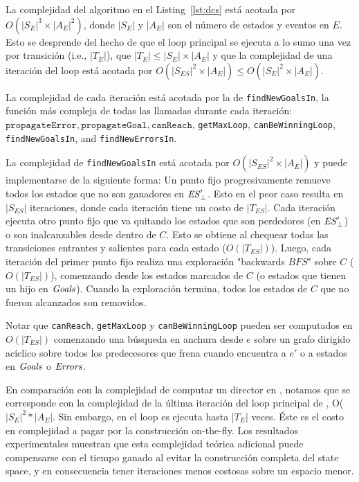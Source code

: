 La complejidad del algoritmo en el Listing~\ref{lst:dcs} está acotada por
	$O(|S_E|^3 
	\times |A_E|^2)$, donde $|S_E|$ y $|A_E|$ son el número de estados y eventos en
	$E$. Esto se desprende del hecho de que el loop principal se ejecuta a lo sumo una vez por transición (i.e., 
	$|T_{E}|$), que $|T_{E}| \leq|S_{E}|\times|A_E|$ y que la complejidad de una iteración del loop está acotada por $O(|S_{ES}|^2 \times |A_{E}|) \leq O(|S_{E}|^2 \times 
	|A_{E}|) $.

La complejidad de cada iteración está acotada por la de \texttt{findNewGoalsIn}, la función más compleja de todas las llamadas durante cada iteración: $\texttt{propagateError}, \texttt{propagateGoal}, 
	\texttt{canReach}$, \texttt{getMaxLoop}, \texttt{canBeWinningLoop}, 
	\texttt{findNewGoalsIn}, and \texttt{findNewErrorsIn}.

La complejidad de \texttt{findNewGoalsIn} está acotada por
	$O(|S_{ES}|^2 \times |A_{E}|)$ y puede implementarse de la siguiente forma: 
	Un punto fijo progresivamente remueve todos los estados que no son ganadores en $\mathit{\mathit{ES}'_{\bot}}$.
	Esto en el peor caso resulta en $|S_{ES}|$ iteraciones, donde cada iteración tiene un costo de $|T_{ES}|$.
	Cada iteración ejecuta otro punto fijo que va quitando los estados que son perdedores (en $\mathit{\mathit{ES}'_{\bot}}$)
	o son inalcanzables desde dentro de $C$.
	Esto se obtiene al chequear todas las transiciones entrantes y salientes para cada estado ($O(|T_{ES}|)$). 
	Luego, cada iteración del primer punto fijo realiza una exploración "backwards $BFS$" sobre $C$ ($O(|T_{ES}|)$), comenzando desde los estados marcados de $C$ (o estados que tienen un hijo en $\mathit{Goals}$). Cuando la exploración termina, todos los estados de $C$ que no fueron alcanzados son removidos.

Notar que \texttt{canReach}, \texttt{getMaxLoop} y
	\texttt{canBeWinningLoop} pueden ser computados en $O(|T_{ES}|)$ comenzando una búsqueda en anchura desde
	$e$ sobre un grafo dirigido acíclico sobre todos los predecesores que frena cuando encuentra a $e'$ o a estados en $\mathit{Goals}$ o $\mathit{Errors}$.

En comparación con la complejidad de computar un director en 
	\cite{Huang:2007:Optimal}, notamos que se corresponde con la complejidad de la última iteración del loop principal de \DCS , O($|S_{E}|^2 * 
	|A_{E}|$.
	Sin embargo, en \DCS el loop es ejecuta hasta
	|$T_E$| veces. Éste es el costo en complejidad a pagar por la construcción on-the-fly. 
	Los resultados experimentales muestran que esta complejidad teórica adicional puede compensarse con el tiempo ganado al evitar la construcción completa del state space, y en consecuencia tener iteraciones menos costosas sobre un espacio menor. 

